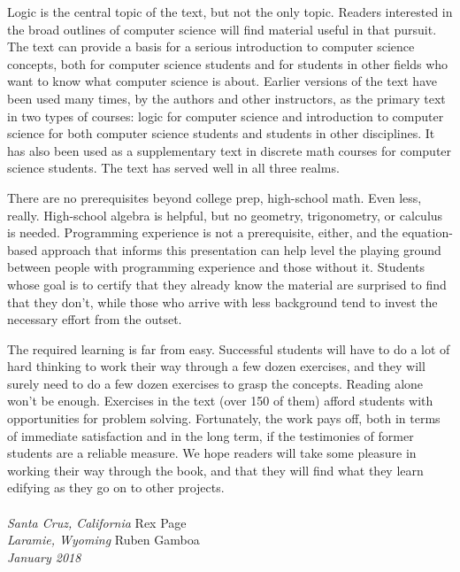 Logic is the central topic of the text, but not the only topic.
Readers interested in the broad outlines of computer science
will find material useful in that pursuit.
The text can provide a basis for a serious introduction
to computer science concepts, both for computer science students
and for students in other fields who want to know
what computer science is about.
Earlier versions of the text have been used many times,
by the authors and other instructors,
as the primary text in two types of courses: logic for computer science
and introduction to computer science for both computer science students
and students in other disciplines.
It has also been used as a supplementary
text in discrete math courses for computer science students.
The text has served well in all three realms.

There are no prerequisites beyond college prep, high-school math.
Even less, really.
High-school algebra is helpful,
but no geometry, trigonometry, or calculus is needed.
Programming experience is not a prerequisite, either, and
the equation-based approach that informs this presentation can
help level the playing ground between people
with programming experience and those without it.
Students whose goal is to certify that they already
know the material are surprised to find that they don't,
while those who arrive with less background tend
to invest the necessary effort from the outset.

The required learning is far from easy.
Successful students will have to do a lot of hard thinking
to work their way through a few dozen exercises,
and they will surely need to do a few dozen exercises to grasp the concepts.
Reading alone won't be enough.
Exercises in the text (over 150 of them) afford students with opportunities
for problem solving.
Fortunately, the work pays off, both in terms of immediate satisfaction
and in the long term, if the testimonies of former students are a
reliable measure.
We hope readers will take some pleasure in working their way through
the book, and that they will find what they learn
edifying as they go on to other projects.
\\
\\
\emph{Santa Cruz, California}   \hfill Rex Page     \\
\emph{Laramie, Wyoming}         \hfill Ruben Gamboa \\
\emph{January 2018}


